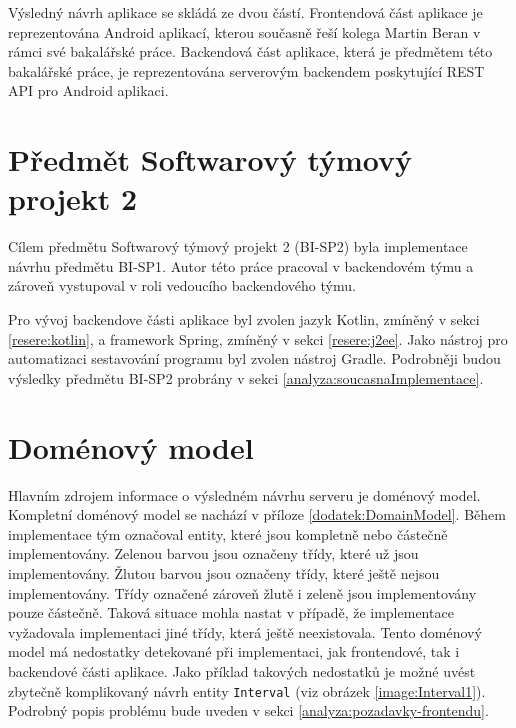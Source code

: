     Výsledný návrh aplikace se skládá ze dvou částí. Frontendová část aplikace je reprezentována Android aplikací, kterou současně řeší kolega Martin Beran v rámci své bakalářské práce. Backendová část aplikace, která je předmětem této bakalářské práce, je reprezentována serverovým backendem poskytující REST API pro Android aplikaci.


\section{Předmět Softwarový týmový projekt 2}\label{analyza:navrh:sp2}
    Cílem předmětu Softwarový týmový projekt 2 (BI-SP2) byla implementace návrhu předmětu BI-SP1. Autor této práce pracoval v backendovém týmu a zároveň vystupoval v roli vedoucího backendového týmu.
    
    Pro vývoj backendove části aplikace byl zvolen jazyk Kotlin, zmíněný v sekci \ref{resere:kotlin}, a framework Spring, zmíněný v sekci \ref{resere:j2ee}. Jako nástroj pro automatizaci sestavování programu byl zvolen nástroj Gradle. Podrobněji  budou výsledky předmětu BI-SP2 probrány v sekci \ref{analyza:soucasnaImplementace}.
        
    
\section{Doménový model}\label{analyza:navrh:DomainModel}
    Hlavním zdrojem informace o výsledném návrhu serveru je doménový model. Kompletní doménový model se nachází v příloze \ref{dodatek:DomainModel}. Během implementace tým označoval entity, které jsou kompletně nebo částečně implementovány. Zelenou barvou jsou označeny třídy, které už jsou implementovány. Žlutou barvou jsou označeny třídy, které ještě nejsou implementovány. Třídy označené zároveň žlutě i zeleně jsou implementovány pouze částečně. Taková situace mohla nastat v případě, že implementace vyžadovala implementaci jiné třídy, která ještě neexistovala. Tento doménový model má nedostatky detekované při implementaci, jak frontendové, tak i backendové části aplikace. Jako příklad takových nedostatků je možné uvést zbytečně komplikovaný návrh entity \texttt{Interval} (viz obrázek \ref{image:Interval1}). Podrobný popis problému bude uveden v sekci \ref{analyza:pozadavky-frontendu}.

